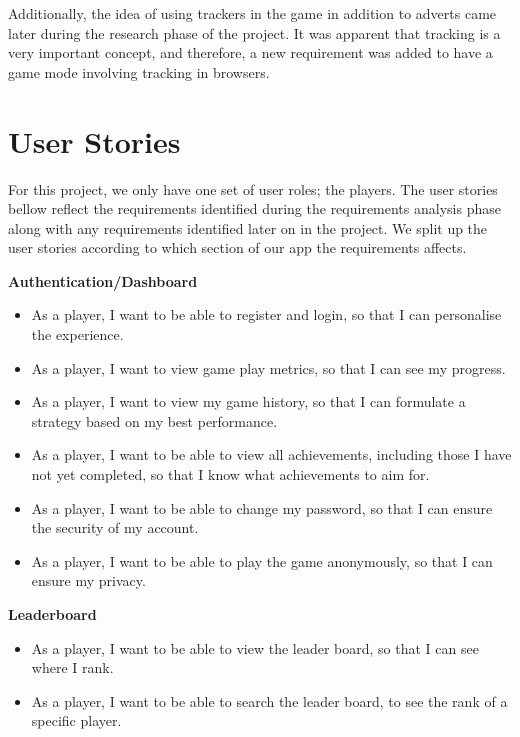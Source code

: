 \documentclass{l4proj}
\begin{document}
Additionally, the idea of using trackers in the game in addition to adverts came later during the research phase of the project. It was apparent that tracking is a very important concept, and therefore, a new requirement was added to have a game mode involving tracking in browsers.

\section{User Stories}
For this project, we only have one set of user roles; the players. The user stories bellow reflect the requirements identified during the requirements analysis phase along with any requirements identified later on in the project. We split up the user stories according to which section of our app the requirements affects.

\textbf{Authentication/Dashboard}
\begin{itemize}
    \item As a player, I want to be able to register and login, so that I can personalise the experience.
    \item As a player, I want to view game play metrics, so that I can see my progress.
    \item As a player, I want to view my game history, so that I can formulate a strategy based on my best performance.
    \item As a player, I want to be able to view all achievements, including those I have not yet completed, so that I know what achievements to aim for.
    \item As a player, I want to be able to change my password, so that I can ensure the security of my account.
    \item As a player, I want to be able to play the game anonymously, so that I can ensure my privacy.
\end{itemize}

\textbf{Leaderboard}
\begin{itemize}
    \item As a player, I want to be able to view the leader board, so that I can see where I rank.
    \item As a player, I want to be able to search the leader board, to see the rank of a specific player.
\end{itemize}
\end{document}

